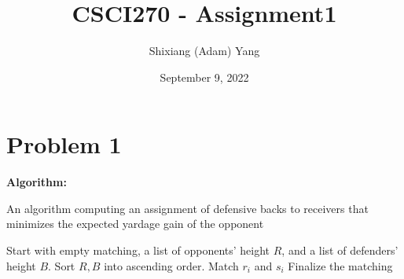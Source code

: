 \documentclass{article}
\author{Shixiang (Adam) Yang}
\date{September 9, 2022}
\title{CSCI270 - Assignment1}
\begin{document}
 \maketitle
\section{Problem 1}
    \textbf{Algorithm: }
    \begin{algorithm}
    \caption{An algorithm computing an assignment of defensive backs to receivers that minimizes the expected yardage gain of the opponent}\label{alg:cap}
    \begin{algorithmic}
    
    \State Start with empty matching, a list of opponents' height $R$, and a list of defenders' height $B$.
    \State Sort $R, B$ into ascending order.
        \State Match $r_i$ and $s_i$
    \EndFor
    \State Finalize the matching
    \end{algorithmic}
    \end{algorithm}
\end{document}
